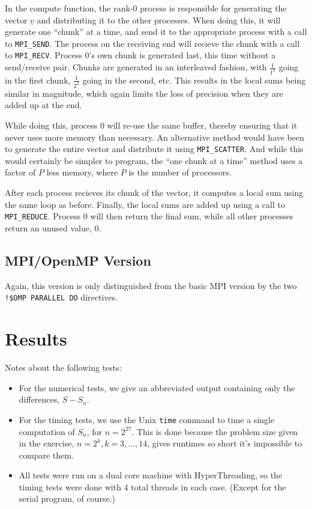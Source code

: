\documentclass[a4paper, 12pt]{article}
\begin{document}
        In the compute function, the rank-0 process is responsible for generating the vector $\underline{v}$ and distributing it to the other processes. When doing this, it will generate one ``chunk'' at a time, and send it to the appropriate process with a call to \texttt{MPI\_SEND}. The process on the receiving end will recieve the chunk with a call to \texttt{MPI\_RECV}. Process 0's own chunk is generated last, this time without a send/receive pair. Chunks are generated in an interleaved fashion, with $\frac{1}{1^2}$ going in the first chunk, $\frac{1}{2^2}$ going in the second, etc. This results in the local sums being similar in magnitude, which again limits the loss of precision when they are added up at the end.

        While doing this, process 0 will re-use the same buffer, thereby ensuring that it never uses more memory than necessary. An alternative method would have been to generate the entire vector and distribute it using \texttt{MPI\_SCATTER}. And while this would certainly be simpler to program, the ``one chunk at a time'' method uses a factor of $P$ less memory, where $P$ is the number of processors.

        After each process recieves its chunk of the vector, it computes a local sum using the same loop as before. Finally, the local sums are added up using a call to \texttt{MPI\_REDUCE}. Process 0 will then return the final sum, while all other processes return an unused value, 0.

    \subsection{MPI/OpenMP Version} %
        Again, this version is only distinguished from the basic MPI version by the two \texttt{!\$OMP PARALLEL DO} directives.

\section{Results} %
\label{sec:results}
    Notes about the following tests: 
    \begin{itemize}
        \item For the numerical tests, we give an abbreviated output containing only the differences, $S - S_n$.
        \item For the timing tests, we use the Unix \texttt{time} command to time a single computation of $S_n$, for $n = 2^{27}$. This is done because the problem size given in the exercise, $n = 2^k, k = 3, \ldots, 14$, gives runtimes so short it's impossible to compare them.
        \item All tests were run on a dual core machine with HyperThreading, so the timing tests were done with 4 total threads in each case. (Except for the serial program, of course.)
    \end{itemize}
\end{document}
